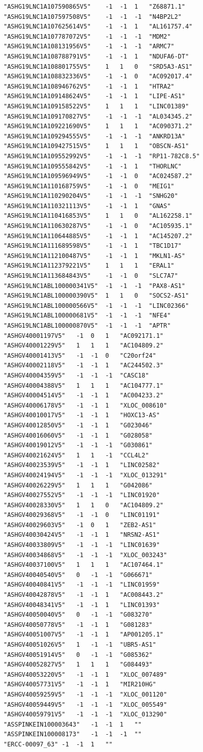 \documentclass[en,black,12pt,normal]{elegantnote}
\begin{document}
\begin{lstlisting}
"ASHG19LNC1A107590865V5"	-1	-1	1	"Z68871.1"
"ASHG19LNC1A107597508V5"	-1	-1	-1	"N4BP2L2"
"ASHG19LNC1A107625614V5"	-1	-1	1	"AL161757.4"
"ASHG19LNC1A107787072V5"	-1	-1	-1	"MDM2"
"ASHG19LNC1A108131956V5"	-1	-1	-1	"ARMC7"
"ASHG19LNC1A108788791V5"	-1	-1	1	"NDUFA6-DT"
"ASHG19LNC1A108801755V5"	1	1	0	"SRD5A3-AS1"
"ASHG19LNC1A108832336V5"	-1	-1	0	"AC092017.4"
"ASHG19LNC1A108946762V5"	-1	-1	1	"HTRA2"
"ASHG19LNC1A109148624V5"	-1	-1	1	"LIPE-AS1"
"ASHG19LNC1A109158522V5"	1	1	1	"LINC01389"
"ASHG19LNC1A109170827V5"	-1	-1	-1	"AL034345.2"
"ASHG19LNC1A109221690V5"	1	1	1	"AC090371.2"
"ASHG19LNC1A109294555V5"	-1	-1	-1	"ANKRD13A"
"ASHG19LNC1A109427515V5"	1	1	1	"OBSCN-AS1"
"ASHG19LNC1A109552992V5"	-1	-1	-1	"RP11-782C8.5"
"ASHG19LNC1A109555842V5"	-1	-1	1	"THORLNC"
"ASHG19LNC1A109596949V5"	-1	-1	0	"AC024587.2"
"ASHG19LNC1A110168759V5"	-1	-1	0	"MEIG1"
"ASHG19LNC1A110290204V5"	-1	-1	-1	"SNHG20"
"ASHG19LNC1A110321113V5"	-1	-1	1	"GNAS"
"ASHG19LNC1A110416853V5"	1	1	0	"AL162258.1"
"ASHG19LNC1A110630287V5"	-1	-1	0	"AC105935.1"
"ASHG19LNC1A110644885V5"	-1	-1	1	"AC145207.2"
"ASHG19LNC1A111689598V5"	-1	-1	1	"TBC1D17"
"ASHG19LNC1A112100487V5"	-1	-1	1	"MKLN1-AS"
"ASHG19LNC1A112379221V5"	1	1	1	"ERAL1"
"ASHG19LNC1A113684843V5"	-1	-1	0	"SLC7A7"
"ASHG19LNC1ABL100000341V5"	-1	-1	-1	"PAX8-AS1"
"ASHG19LNC1ABL100000390V5"	1	1	0	"SOCS2-AS1"
"ASHG19LNC1ABL100000566V5"	-1	-1	-1	"LINC02366"
"ASHG19LNC1ABL100000681V5"	-1	-1	-1	"NFE4"
"ASHG19LNC1ABL100000870V5"	-1	-1	-1	"APTR"
"ASHGV40001197V5"	-1	0	1	"AC092171.1"
"ASHGV40001229V5"	1	1	1	"AC104809.2"
"ASHGV40001413V5"	-1	-1	0	"C20orf24"
"ASHGV40002118V5"	-1	-1	1	"AC244502.3"
"ASHGV40004359V5"	-1	-1	-1	"CASC18"
"ASHGV40004388V5"	1	1	1	"AC104777.1"
"ASHGV40004514V5"	-1	-1	1	"AC004233.2"
"ASHGV40006178V5"	-1	-1	1	"XLOC_008610"
"ASHGV40010017V5"	-1	-1	1	"HOXC13-AS"
"ASHGV40012850V5"	-1	-1	1	"G023046"
"ASHGV40016060V5"	-1	-1	1	"G028058"
"ASHGV40019012V5"	-1	-1	-1	"G030861"
"ASHGV40021624V5"	1	1	-1	"CCL4L2"
"ASHGV40023539V5"	-1	-1	1	"LINC02582"
"ASHGV40024194V5"	-1	-1	-1	"XLOC_013291"
"ASHGV40026229V5"	1	1	1	"G042086"
"ASHGV40027552V5"	-1	-1	-1	"LINC01920"
"ASHGV40028330V5"	1	1	0	"AC104809.2"
"ASHGV40029368V5"	-1	-1	0	"LINC01191"
"ASHGV40029603V5"	-1	0	1	"ZEB2-AS1"
"ASHGV40030424V5"	-1	-1	1	"NRSN2-AS1"
"ASHGV40033809V5"	-1	-1	-1	"LINC01639"
"ASHGV40034868V5"	-1	-1	-1	"XLOC_003243"
"ASHGV40037100V5"	1	1	1	"AC107464.1"
"ASHGV40040540V5"	0	-1	-1	"G066671"
"ASHGV40040841V5"	-1	-1	-1	"LINC01959"
"ASHGV40042878V5"	-1	-1	1	"AC008443.2"
"ASHGV40048341V5"	-1	-1	1	"LINC01393"
"ASHGV40050040V5"	0	-1	-1	"G083270"
"ASHGV40050778V5"	-1	-1	1	"G081283"
"ASHGV40051007V5"	-1	-1	1	"AP001205.1"
"ASHGV40051026V5"	1	-1	-1	"UBR5-AS1"
"ASHGV40051914V5"	0	-1	-1	"G085362"
"ASHGV40052827V5"	1	1	1	"G084493"
"ASHGV40053220V5"	-1	-1	1	"XLOC_007489"
"ASHGV40057731V5"	-1	-1	1	"MIR210HG"
"ASHGV40059259V5"	-1	-1	-1	"XLOC_001120"
"ASHGV40059449V5"	-1	-1	-1	"XLOC_005549"
"ASHGV40059791V5"	-1	-1	-1	"XLOC_013290"
"ASSPINKEIN100003643"	-1	-1	1	""
"ASSPINKEIN100008173"	-1	-1	-1	""
"ERCC-00097_63"	-1	-1	1	""              
\end{lstlisting}
\end{document}
